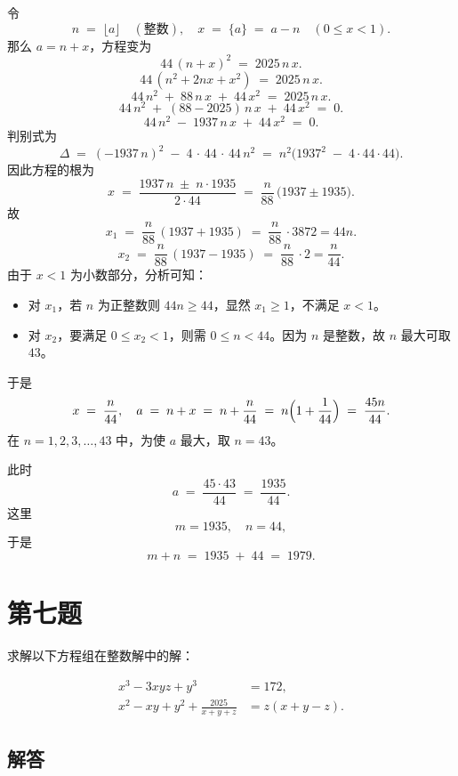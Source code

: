 \documentclass[12pt, a4paper]{article}
\theoremstyle{definition}
\theoremstyle{remark}
\begin{document}
\noindent 令
$$
n \;=\; \lfloor a\rfloor \quad(\text{整数}), 
\quad x \;=\; \{a\} \;=\; a - n \quad (0 \le x < 1).
$$
那么 \(a = n + x\)，方程变为
$$
44\, (n + x)^2 \;=\; 2025\,n\,x.
$$
$$
44\,(n^2 + 2nx + x^2)
\;=\;
2025\,n\,x.
$$
$$
44\,n^2 \;+\; 88\,n\,x \;+\; 44\,x^2
\;=\;
2025\,n\,x.
$$
$$
44\,n^2 
\;+\; (88 - 2025)\,n\,x
\;+\;
44\,x^2
\;=\;
0.
$$
$$
44\,n^2 
\;-\; 1937\,n\,x
\;+\;
44\,x^2
\;=\;
0.
$$
\noindent 判别式为
$$
\Delta 
\;=\;
(-1937\,n)^2 \;-\; 4\,\cdot\,44\,\cdot\,44\,n^2
\;=\;
n^2\bigl(1937^2 \;-\; 4\cdot 44\cdot 44\bigr).
$$
\noindent 因此方程的根为
$$
x \;=\;
\frac{1937\,n \;\pm\; n \cdot 1935}{2 \cdot 44}
\;=\;
\frac{n}{88}\,\bigl(1937 \pm 1935\bigr).
$$
\noindent 故
$$
x_1 \;=\; \frac{n}{88}\,(1937 + 1935) \;=\; \frac{n}{88}\,\cdot 3872 = 44n.
$$
$$
x_2 \;=\; \frac{n}{88}\,(1937 - 1935) \;=\; \frac{n}{88}\,\cdot 2 = \frac{n}{44}.
$$
\noindent 由于 \(x < 1\) 为小数部分，分析可知：
\begin{itemize}
    \item 对 \(x_1\)，若 \(n\) 为正整数则 \(44n \ge 44\)，显然 \(x_1 \ge 1\)，不满足 \(x<1\)。  
    \item 对 \(x_2\)，要满足 \(0 \le x_2 < 1\)，则需 \(0 \le n < 44\)。因为 \(n\) 是整数，故 \(n\) 最大可取 \(43\)。  
\end{itemize}

\noindent 于是
$$
x \;=\; \frac{n}{44},
\quad
a \;=\; n + x \;=\; n + \frac{n}{44} \;=\; n\Bigl(1 + \frac{1}{44}\Bigr) \;=\; \frac{45n}{44}.
$$
在 \(n = 1,2,3,\dots,43\) 中，为使 \(a\) 最大，取 \(n=43\)。  

\noindent 此时
$$
a \;=\; \frac{45 \cdot 43}{44} \;=\; \frac{1935}{44}.
$$
\noindent 这里
$$
m = 1935,
\quad
n = 44,
$$
于是
$$
m + n 
\;=\;
1935 \;+\; 44
\;=\;
1979.
$$

\newpage

\section{第七题}

\noindent 求解以下方程组在整数解中的解：

$$
\begin{aligned}
x^3 - 3xyz + y^3 & = 172, \\
x^2 - xy + y^2 + \frac{2025}{x + y + z} & = z(x + y - z).
\end{aligned}
$$



\subsection{解答}
\end{document}
